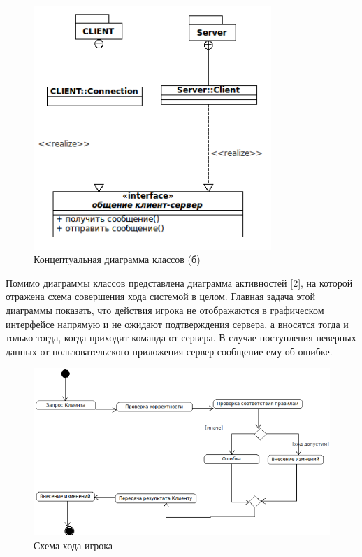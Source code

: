 \begin{figure}[ht]
\centering
\includegraphics[width=9cm]{images/class1.png}
\caption{Концептуальная диаграмма классов (б)}
\label{fig2}
\end{figure}

Помимо диаграммы классов представлена диаграмма активностей [\ref{fig}], на которой отражена схема совершения хода системой в целом. Главная задача этой диаграммы показать, что действия игрока не отображаются в графическом интерфейсе напрямую и не ожидают подтверждения сервера, а вносятся тогда и только тогда, когда приходит команда от сервера. В случае поступления неверных данных от пользовательского приложения сервер  сообщение ему об ошибке. 

\begin{figure}[ht]
\centering
\includegraphics[width=15cm]{images/activitygen.png}
\caption{Схема хода игрока}
\label{fig}
\end{figure}

\newpage
\endinput


